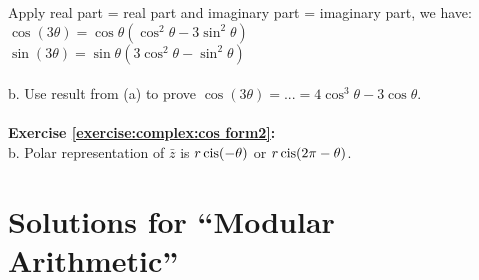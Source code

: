 Apply real part = real part and imaginary part = imaginary part, we have:\\
$\cos(3\theta)=\cos\theta(\cos^{2}\theta-3\sin^{2}\theta)$\\
$\sin(3\theta)=\sin\theta(3\cos^{2}\theta-\sin^{2}\theta)$\\
\\
b. Use result from (a) to prove $\cos(3\theta)=...=4\cos^{3}\theta-3\cos\theta $.\\
\\
\textbf{Exercise \ref{exercise:complex:cos form2}:}\\
b. Polar representation of $\bar{z}$ is $r\operatorname{cis}(-\theta)$ or $r\operatorname{cis}(2\pi-\theta)$.\\

\section{Solutions for ``Modular Arithmetic''}
\noindent{}\bigskip

